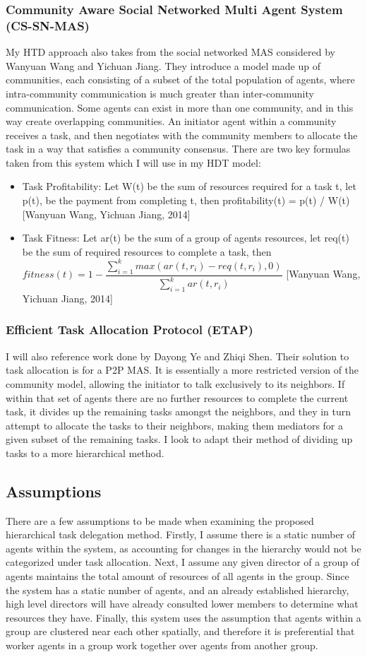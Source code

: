 \documentclass[12pt,letterpaper,onecolumn]{article}
\begin{document}
	\subsubsection{Community Aware Social Networked Multi Agent System (CS-SN-MAS)}
	My HTD approach also takes from the social networked MAS considered by Wanyuan Wang and Yichuan Jiang. They introduce a model made up of communities, each consisting of a subset of the total population of agents, where intra-community communication is much greater than inter-community communication. Some agents can exist in more than one community, and in this way create overlapping communities. An initiator agent within a community receives a task, and then negotiates with the community members to allocate the task in a way that satisfies a community consensus. There are two key formulas taken from this system which I will use in my HDT model:
	\begin{itemize}
		\item Task Profitability: Let W(t) be the sum of resources required for a task t, let p(t), be the payment from completing t, then profitability(t) = p(t) / W(t) [Wanyuan Wang, Yichuan Jiang, 2014]
		\item Task Fitness: Let ar(t) be the sum of a group of agents resources, let req(t) be the sum of required resources to complete a task, then $fitness(t) = 1 - \dfrac{\sum_{i=1}^{k} max(ar(t, r_{i}) - req(t, r_{i}), 0)}{\sum_{i=1}^{k} ar(t, r_{i})} $ [Wanyuan Wang, Yichuan Jiang, 2014]
	\end{itemize}
	\subsubsection{Efficient Task Allocation Protocol (ETAP)}
	I will also reference work done by Dayong Ye and Zhiqi Shen. Their solution to task allocation is for a P2P MAS. It is essentially a more restricted version of the community model, allowing the initiator to talk exclusively to its neighbors. If within that set of agents there are no further resources to complete the current task, it divides up the remaining tasks amongst the neighbors, and they in turn attempt to allocate the tasks to their neighbors, making them mediators for a given subset of the remaining tasks. I look to adapt their method of dividing up tasks to a more hierarchical method. 
	\subsection{Assumptions}
	There are a few assumptions to be made when examining the proposed hierarchical task delegation method. Firstly, I assume there is a static number of agents within the system, as accounting for changes in the hierarchy would not be categorized under task allocation. Next, I assume any given director of a group of agents maintains the total amount of resources of all agents in the group. Since the system has a static number of agents, and an already established hierarchy, high level directors will have already consulted lower members to determine what resources they have. Finally, this system uses the assumption that agents within a group are clustered near each other spatially, and therefore it is preferential that worker agents in a group work together over agents from another group.
\end{document}
